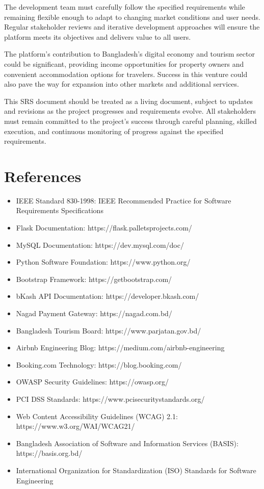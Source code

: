 \documentclass[12pt,a4paper]{report}
\begin{document}
The development team must carefully follow the specified requirements while remaining flexible enough to adapt to changing market conditions and user needs. Regular stakeholder reviews and iterative development approaches will ensure the platform meets its objectives and delivers value to all users.

The platform's contribution to Bangladesh's digital economy and tourism sector could be significant, providing income opportunities for property owners and convenient accommodation options for travelers. Success in this venture could also pave the way for expansion into other markets and additional services.

This SRS document should be treated as a living document, subject to updates and revisions as the project progresses and requirements evolve. All stakeholders must remain committed to the project's success through careful planning, skilled execution, and continuous monitoring of progress against the specified requirements.

\section*{References}

\begin{itemize}
    \item IEEE Standard 830-1998: IEEE Recommended Practice for Software Requirements Specifications
    \item Flask Documentation: https://flask.palletsprojects.com/
    \item MySQL Documentation: https://dev.mysql.com/doc/
    \item Python Software Foundation: https://www.python.org/
    \item Bootstrap Framework: https://getbootstrap.com/
    \item bKash API Documentation: https://developer.bkash.com/
    \item Nagad Payment Gateway: https://nagad.com.bd/
    \item Bangladesh Tourism Board: https://www.parjatan.gov.bd/
    \item Airbnb Engineering Blog: https://medium.com/airbnb-engineering
    \item Booking.com Technology: https://blog.booking.com/
    \item OWASP Security Guidelines: https://owasp.org/
    \item PCI DSS Standards: https://www.pcisecuritystandards.org/
    \item Web Content Accessibility Guidelines (WCAG) 2.1: https://www.w3.org/WAI/WCAG21/
    \item Bangladesh Association of Software and Information Services (BASIS): https://basis.org.bd/
    \item International Organization for Standardization (ISO) Standards for Software Engineering
\end{itemize}
\end{document}
